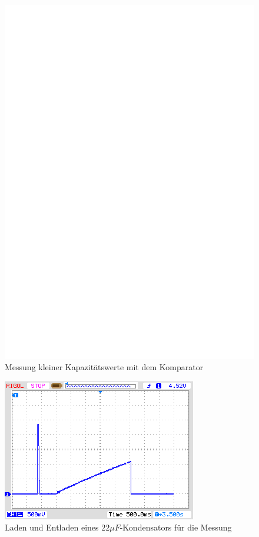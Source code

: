 \begin{figure}[H]
\centering
\includegraphics[]{../FIG/Comparat.eps}
\caption{Messung kleiner Kapazitätswerte mit dem Komparator}
\label{fig:comparat}
\end{figure}

\begin{figure}[H]
  \centering
    \includegraphics[]{../PNG/charge_22uF.png}
  \caption{Laden und Entladen eines \(22\mu F\)-Kondensators für die Messung}
  \label{pic:c22uF}
\end{figure}


